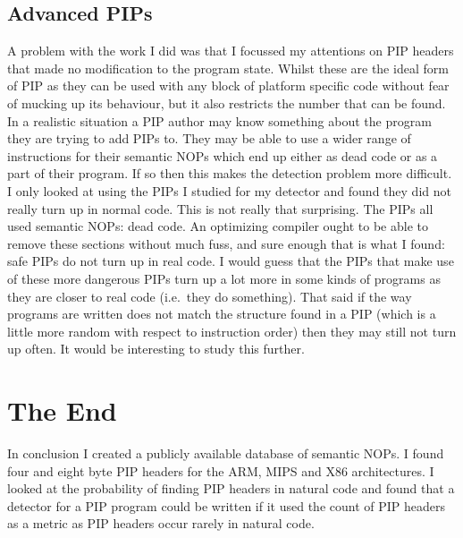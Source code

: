 \documentclass[10pt,]{book}
\begin{document}
\subsection{Advanced PIPs}

A problem with the work I did was that I focussed my attentions on PIP
headers that made no modification to the program state. Whilst these are
the ideal form of PIP as they can be used with any block of platform
specific code without fear of mucking up its behaviour, but it also
restricts the number that can be found. In a realistic situation a PIP
author may know something about the program they are trying to add PIPs
to. They may be able to use a wider range of instructions for their
semantic NOPs which end up either as dead code or as a part of their
program. If so then this makes the detection problem more difficult. I
only looked at using the PIPs I studied for my detector and found they
did not really turn up in normal code. This is not really that
surprising. The PIPs all used semantic NOPs: dead code. An optimizing
compiler ought to be able to remove these sections without much fuss,
and sure enough that is what I found: safe PIPs do not turn up in real
code. I would guess that the PIPs that make use of these more dangerous
PIPs turn up a lot more in some kinds of programs as they are closer to
real code (i.e.~they do something). That said if the way programs are
written does not match the structure found in a PIP (which is a little
more random with respect to instruction order) then they may still not
turn up often. It would be interesting to study this further.

\section{The End}

In conclusion I created a publicly available database of semantic NOPs.
I found four and eight byte PIP headers for the ARM, MIPS and X86
architectures. I looked at the probability of finding PIP headers in
natural code and found that a detector for a PIP program could be
written if it used the count of PIP headers as a metric as PIP headers
occur rarely in natural code.
\end{document}
